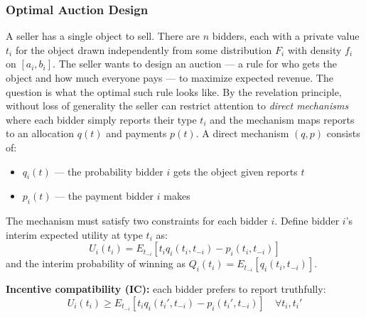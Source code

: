 \documentclass[11pt,english]{article}
\begin{document}
\subsubsection{Optimal Auction Design}
A seller has a single object to sell. There are $n$ bidders, each with a private value $t_i$ for the object drawn independently from some distribution $F_i$ with density $f_i$ on $[a_i, b_i]$. The seller wants to design an auction --- a rule for who gets the object and how much everyone pays --- to maximize expected revenue. The question is what the optimal such rule looks like. By the revelation principle, without loss of generality the seller can restrict attention to \textit{direct mechanisms} where each bidder simply reports their type $t_i$ and the mechanism maps reports to an allocation $q(t)$ and payments $p(t)$. A direct mechanism $(q,p)$ consists of:
\begin{itemize}
    \item $q_i(t)$ --- the probability bidder $i$ gets the object given reports $t$
    \item $p_i(t)$ --- the payment bidder $i$ makes
\end{itemize}
The mechanism must satisfy two constraints for each bidder $i$. Define bidder $i$'s interim expected utility at type $t_i$ as:
\begin{equation}
    U_i(t_i) = E_{t_{-i}}\left[t_i q_i(t_i, t_{-i}) - p_i(t_i, t_{-i})\right]
\end{equation}
and the interim probability of winning as $Q_i(t_i) = E_{t_{-i}}[q_i(t_i, t_{-i})]$.

\textbf{Incentive compatibility (IC):} each bidder prefers to report truthfully:
\begin{equation}
    U_i(t_i) \geq E_{t_{-i}}\left[t_i q_i(t_i', t_{-i}) - p_i(t_i', t_{-i})\right] \quad \forall t_i, t_i'
\end{equation}
\end{document}
